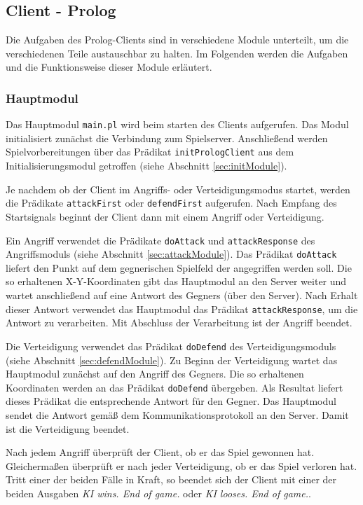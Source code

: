 \subsection{Client - Prolog} \label{sec:Prologclient}
	Die Aufgaben des Prolog-Clients sind in verschiedene Module unterteilt, um die verschiedenen Teile austauschbar zu halten. 
	Im Folgenden werden die Aufgaben und die Funktionsweise dieser Module erläutert.
	



\subsubsection{Hauptmodul}
	Das Hauptmodul \texttt{main.pl} wird beim starten des Clients aufgerufen. Das Modul initialisiert zunächst die Verbindung zum
	Spielserver. Anschließend werden Spielvorbereitungen über das Prädikat \texttt{initPrologClient} aus dem 
	Initialisierungsmodul getroffen (siehe Abschnitt \ref{sec:initModule}).
	
	Je nachdem ob der Client im Angriffs- oder Verteidigungsmodus startet, werden die Prädikate \texttt{attackFirst} oder
	\texttt{defendFirst} aufgerufen. Nach Empfang des Startsignals beginnt der Client dann mit einem Angriff oder Verteidigung.
	
	Ein Angriff verwendet die Prädikate \texttt{doAttack} und \texttt{attackResponse} des Angriffsmoduls (siehe Abschnitt
	\ref{sec:attackModule}).
	Das Prädikat \texttt{doAttack} liefert den Punkt auf dem gegnerischen Spielfeld der angegriffen werden soll.
	Die so erhaltenen X-Y-Koordinaten gibt das Hauptmodul an den Server weiter und wartet anschließend auf eine Antwort des 
	Gegners (über den Server). 
	Nach Erhalt dieser Antwort verwendet das Hauptmodul das Prädikat \texttt{attackResponse}, um die Antwort zu verarbeiten.
	Mit Abschluss der Verarbeitung ist der Angriff beendet.
	
	Die Verteidigung verwendet das Prädikat \texttt{doDefend} des Verteidigungsmoduls (siehe Abschnitt \ref{sec:defendModule}).
	Zu Beginn der Verteidigung wartet das Hauptmodul zunächst auf den Angriff des Gegners. Die so erhaltenen Koordinaten
	werden an das Prädikat \texttt{doDefend} übergeben. Als Resultat liefert dieses Prädikat die entsprechende Antwort für den
	Gegner. Das Hauptmodul sendet die Antwort gemäß dem Kommunikationsprotokoll an den Server. Damit ist die Verteidigung 
	beendet.
	
	Nach jedem Angriff überprüft der Client, ob er das Spiel gewonnen hat. Gleichermaßen überprüft er nach jeder Verteidigung, 
	ob er das Spiel verloren hat. Tritt einer der beiden Fälle in Kraft, so beendet sich der Client mit einer der beiden Ausgaben
	\textit{KI wins. End of game.} oder \textit{KI looses. End of game.}.
	


